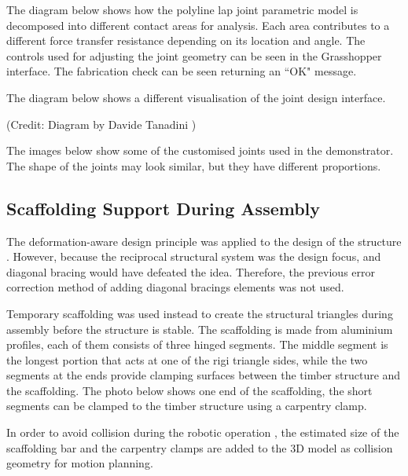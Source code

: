 The diagram below shows how the polyline lap joint parametric model is decomposed into different contact areas for analysis. Each area contributes to a different force transfer resistance depending on its location and angle. The controls used for adjusting the joint geometry can be seen in the Grasshopper interface. The fabrication check can be seen returning an ``OK" message.




The diagram below shows a different visualisation of the joint design interface. 



{\footnotesize (Credit: Diagram by Davide Tanadini \parencite{tanadiniLimitAnalysisTimber2023})}

The images below show some of the customised joints used in the demonstrator. The shape of the joints may look similar, but they have different proportions. 




\subsection{Scaffolding Support During Assembly}
\label{subsection:exploration_5_scaffolding_support_during_assembly}

The deformation-aware design principle was applied to the design of the structure . However, because the reciprocal structural system was the design focus, and diagonal bracing would have defeated the idea. Therefore, the previous error correction method of adding diagonal bracings elements was not used.

Temporary scaffolding was used instead to create the structural triangles during assembly before the structure is stable. The scaffolding is made from aluminium profiles, each of them consists of three hinged segments. The middle segment is the longest portion that acts at one of the rigi triangle sides, while the two segments at the ends provide clamping surfaces between the timber structure and the scaffolding. The photo below shows one end of the scaffolding, the short segments can be clamped to the timber structure using a carpentry clamp.




In order to avoid collision during the robotic operation , the estimated size of the scaffolding bar and the carpentry clamps are added to the 3D model as collision geometry for motion planning.

